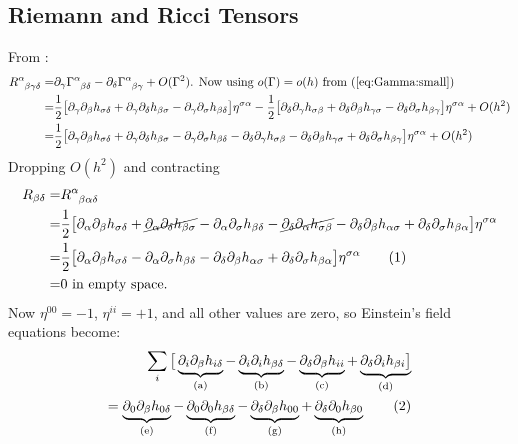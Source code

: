 \documentclass[]{article}
\newcommand\numberthis{\addtocounter{equation}{1}\tag{\theequation}}
\begin{document}
\subsection{Riemann and Ricci Tensors}
From \cite[Lecture 3]{susskind2012general}:
\begin{align*}
	R\indices{^\alpha_{\beta\gamma\delta}} =& \partial_\gamma\Gamma\indices{^\alpha_{\beta\delta}}-\partial_\delta\Gamma\indices{^\alpha_{\beta\gamma}} + O(\Gamma^2) \text{. Now using $o(\Gamma)=o(h)$ from (\ref{eq:Gamma:small})} \\
	=& \frac{1}{2} \big[ \partial_\gamma\partial_\beta h_{\sigma\delta} + \partial_\gamma\partial_\delta h_{\beta\sigma} - \partial_\gamma\partial_\sigma h_{\beta\delta}\big] \eta^{\sigma\alpha }- \frac{1}{2} \big[ \partial_\delta\partial_\gamma h_{\sigma\beta} + \partial_\delta\partial_\beta h_{\gamma\sigma} - \partial_\delta\partial_\sigma h_{\beta\gamma}\big] \eta^{\sigma\alpha }+ O(h^2)\\
	=& \frac{1}{2} \big[ \partial_\gamma\partial_\beta h_{\sigma\delta} + \partial_\gamma\partial_\delta h_{\beta\sigma} - \partial_\gamma\partial_\sigma h_{\beta\delta} - \partial_\delta\partial_\gamma h_{\sigma\beta} - \partial_\delta\partial_\beta h_{\gamma\sigma} + \partial_\delta\partial_\sigma h_{\beta\gamma}\big] \eta^{\sigma\alpha }+ O(h^2)
\end{align*}
Dropping $O(h^2)$ and contracting
\begin{align*}
	R_{\beta\delta} =& 	R\indices{^\alpha_{\beta\alpha\delta}}\\
	=& \frac{1}{2} \big[ \partial_\alpha\partial_\beta h_{\sigma\delta} + \cancel{\partial_\alpha\partial_\delta h_{\beta\sigma}} - \partial_\alpha\partial_\sigma h_{\beta\delta} - \cancel{\partial_\delta\partial_\alpha h_{\sigma\beta}} - \partial_\delta\partial_\beta h_{\alpha\sigma} + \partial_\delta\partial_\sigma h_{\beta\alpha}\big] \eta^{\sigma\alpha }
	\\
	=& \frac{1}{2} \big[ \partial_\alpha\partial_\beta h_{\sigma\delta} - \partial_\alpha\partial_\sigma h_{\beta\delta} -  \partial_\delta\partial_\beta h_{\alpha\sigma} + \partial_\delta\partial_\sigma h_{\beta\alpha}\big] \eta^{\sigma\alpha } \numberthis \label{eq:linearized}\\
	=& 0 \text{ in empty space}.
\end{align*}
Now $\eta^{00}=-1$, $\eta^{ii}=+1$, and all other values are zero, so Einstein's field equations become:
\begin{align*}
	\sum_i\big[\underbrace{\partial_i\partial_\beta h_{i\delta}}_\text{(a)} - \underbrace{\partial_i\partial_i h_{\beta\delta}}_\text{(b)} -  \underbrace{\partial_\delta\partial_\beta h_{ii}}_\text{(c)} + \underbrace{\partial_\delta\partial_i h_{\beta i}\big]}_\text{(d)}\\
	=\underbrace{\partial_0\partial_\beta h_{0\delta}}_\text{(e)} - \underbrace{\partial_0\partial_0 h_{\beta\delta}}_\text{(f)} -  \underbrace{\partial_\delta\partial_\beta h_{00}}_\text{(g)} + \underbrace{\partial_\delta\partial_0 h_{\beta 0}}_\text{(h)} \numberthis \label{eq:expanded_h}
\end{align*}
\end{document}
